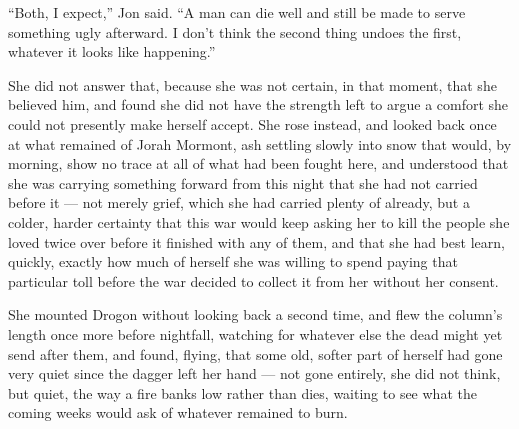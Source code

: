 “Both, I expect,” Jon said. “A man can die well and still be made to serve something ugly afterward. I don’t think the second thing undoes the first, whatever it looks like happening.”

She did not answer that, because she was not certain, in that moment, that she believed him, and found she did not have the strength left to argue a comfort she could not presently make herself accept. She rose instead, and looked back once at what remained of Jorah Mormont, ash settling slowly into snow that would, by morning, show no trace at all of what had been fought here, and understood that she was carrying something forward from this night that she had not carried before it — not merely grief, which she had carried plenty of already, but a colder, harder certainty that this war would keep asking her to kill the people she loved twice over before it finished with any of them, and that she had best learn, quickly, exactly how much of herself she was willing to spend paying that particular toll before the war decided to collect it from her without her consent.

She mounted Drogon without looking back a second time, and flew the column’s length once more before nightfall, watching for whatever else the dead might yet send after them, and found, flying, that some old, softer part of herself had gone very quiet since the dagger left her hand — not gone entirely, she did not think, but quiet, the way a fire banks low rather than dies, waiting to see what the coming weeks would ask of whatever remained to burn.